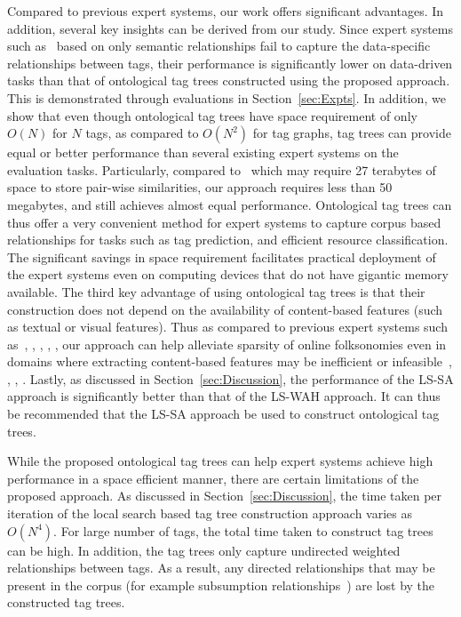 Compared to previous expert systems, our work offers significant advantages. In addition, several key insights can be derived from our study. Since expert systems such as~\cite{MohdSemantic13} based on only semantic relationships fail to capture the data-specific relationships between tags, their performance is significantly lower on data-driven tasks than that of ontological tag trees constructed using the proposed approach. This is demonstrated through evaluations in Section~\ref{sec:Expts}. In addition, we show that even though ontological tag trees have space requirement of only $O(N)$ for $N$ tags, as compared to $O(N^2)$ for tag graphs, tag trees can provide equal or better performance than several existing expert systems on the evaluation tasks. Particularly, compared to~\cite{sigurbjornsson2008flickr} which may require 27 terabytes of space to store pair-wise similarities, our approach requires less than 50 megabytes, and still achieves almost equal performance. Ontological tag trees can thus offer a very convenient method for expert systems to capture corpus based relationships for tasks such as tag prediction, and efficient resource classification. The significant savings in space requirement facilitates practical deployment of the expert systems even on computing devices that do not have gigantic memory available. The third key advantage of using ontological tag trees is that their construction does not depend on the availability of content-based features (such as textual or visual features). Thus as compared to previous expert systems such as~\cite{li2009learning}, \cite{wu2009distance}, \cite{HsiehCollab09}, \cite{ChenEstim15}, \cite{SunLang11}, our approach can help alleviate sparsity of online folksonomies even in domains where extracting content-based features may be inefficient or infeasible~\cite{huang2010text}, \cite{song2010taxonomic}, \cite{zanetti2008walk}, \cite{yin2009exploring}. Lastly, as discussed in Section~\ref{sec:Discussion}, the performance of the LS-SA approach is significantly better than that of the LS-WAH approach. It can thus be recommended that the LS-SA approach be used to construct ontological tag trees. 


While the proposed ontological tag trees can help expert systems achieve high performance in a space efficient manner, there are certain limitations of the proposed approach. As discussed in Section~\ref{sec:Discussion}, the time taken per iteration of the local search based tag tree construction approach varies as $O(N^4)$. For large number of tags, the total time taken to construct tag trees can be high. In addition, the tag trees only capture undirected weighted relationships between tags. As a result, any directed relationships that may be present in the corpus (for example subsumption relationships~\cite{SubsumptionFlickr}) are lost by the constructed tag trees. 


